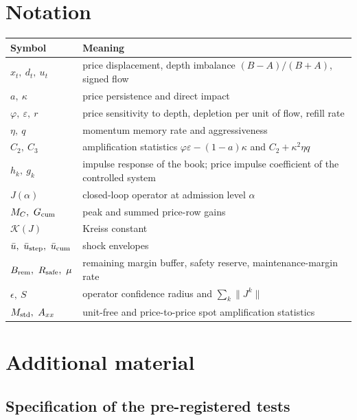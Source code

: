\section{Notation}\label{app:notation}
\begin{longtable}{p{}p{}}
\toprule
Symbol & Meaning\\
\midrule
\endhead
$x_t,\ d_t,\ u_t$ & price displacement, depth imbalance $(B-A)/(B+A)$, signed flow\\
$a,\ \kappa$ & price persistence and direct impact\\
$\varphi,\ \varepsilon,\ r$ & price sensitivity to depth, depletion per unit of flow, refill rate\\
$\eta,\ q$ & momentum memory rate and aggressiveness\\
$C_2,\ C_3$ & amplification statistics $\varphi\varepsilon-(1-a)\kappa$ and $C_2+\kappa^2\eta q$\\
$h_k,\ g_k$ & impulse response of the book; price impulse coefficient of the controlled system\\
$J(\alpha)$ & closed-loop operator at admission level $\alpha$\\
$M_C,\ G_{\rm cum}$ & peak and summed price-row gains\\
$\mathcal K(J)$ & Kreiss constant\\
$\bar u,\ \bar u_{\rm step},\ \bar u_{\rm cum}$ & shock envelopes\\
$B_{\rm rem},\ R_{\rm safe},\ \mu$ & remaining margin buffer, safety reserve, maintenance-margin rate\\
$\epsilon,\ S$ & operator confidence radius and $\sum_k\|J^k\|$\\
$M_{\rm std},\ A_{xx}$ & unit-free and price-to-price spot amplification statistics\\
\bottomrule
\end{longtable}

\section{Additional material}\label{app:ia}

\subsection{Specification of the pre-registered tests}
